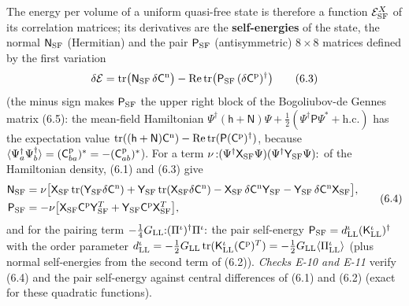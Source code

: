 \documentclass[
  10pt,
]{article}
\begin{document}
The energy per volume of a uniform quasi-free state is therefore a
function \(\mathcal E^X_{\rm SF}\) of its correlation matrices; its
derivatives are the \textbf{self-energies} of the state, the normal
\(\mathsf N_{\rm SF}\) (Hermitian) and the pair \(\mathsf P_{\rm SF}\)
(antisymmetric) \(8\times8\) matrices defined by the first variation
\[\delta\mathcal E=\mathrm{tr}\big(\mathsf N_{\rm SF}\,\delta\mathsf C^{\rm n}\big)-\mathrm{Re}\,\mathrm{tr}\big(\mathsf P_{\rm SF}\,(\delta\mathsf C^{\rm p})^\dagger\big)\tag{6.3}\]
(the minus sign makes \(\mathsf P_{\rm SF}\) the upper right block of
the Bogoliubov-de Gennes matrix (6.5): the mean-field Hamiltonian
\(\Psi^\dagger(\mathsf h+\mathsf N)\Psi+\tfrac12(\Psi^\dagger\mathsf P\Psi^*+\text{h.c.})\)
has the expectation value
\(\mathrm{tr}((\mathsf h+\mathsf N)\mathsf C^{\rm n})-\mathrm{Re}\,\mathrm{tr}(\mathsf P(\mathsf C^{\rm p})^\dagger)\),
because
\(\langle\Psi^\dagger_a\Psi^\dagger_b\rangle=(\mathsf C^{\rm p}_{ba})^*=-(\mathsf C^{\rm p}_{ab})^*\)).
For a term
\(\nu\,{:}(\Psi^\dagger\mathsf X_{\rm SF}\Psi)(\Psi^\dagger\mathsf Y_{\rm SF}\Psi){:}\)
of the Hamiltonian density, (6.1) and (6.3) give
\[\begin{aligned}\mathsf N_{\rm SF}&=\nu\big[\mathsf X_{\rm SF}\,\mathrm{tr}(\mathsf Y_{\rm SF}\delta\mathsf C^{\rm n})+\mathsf Y_{\rm SF}\,\mathrm{tr}(\mathsf X_{\rm SF}\delta\mathsf C^{\rm n})-\mathsf X_{\rm SF}\,\delta\mathsf C^{\rm n}\mathsf Y_{\rm SF}-\mathsf Y_{\rm SF}\,\delta\mathsf C^{\rm n}\mathsf X_{\rm SF}\big],\\\mathsf P_{\rm SF}&=-\nu\big[\mathsf X_{\rm SF}\mathsf C^{\rm p}\mathsf Y_{\rm SF}^T+\mathsf Y_{\rm SF}\mathsf C^{\rm p}\mathsf X_{\rm SF}^T\big],\end{aligned}\tag{6.4}\]
and for the pairing term
\(-\tfrac14G_{\rm LL}{:}(\Pi^\iota)^\dagger\Pi^\iota{:}\) the pair
self-energy
\(\mathsf P_{\rm SF}=d^\iota_{\rm LL}(\mathsf K^\iota_{\rm LL})^\dagger\)
with the order parameter
\(d^\iota_{\rm LL}=-\tfrac12G_{\rm LL}\,\mathrm{tr}(\mathsf K^\iota_{\rm LL}(\mathsf C^{\rm p})^T)=-\tfrac12G_{\rm LL}\langle\Pi^\iota_{\rm LL}\rangle\)
(plus normal self-energies from the second term of (6.2)). \emph{Checks
E-10 and E-11} verify (6.4) and the pair self-energy against central
differences of (6.1) and (6.2) (exact for these quadratic functions).
\end{document}
